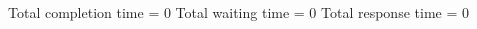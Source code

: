 \begin{RTGrid}[width=0.8\textwidth]{5}{20}
\end{RTGrid}\newline\newline
Total completion time = 0\newline
Total waiting time = 0\newline
Total response time = 0\newline

